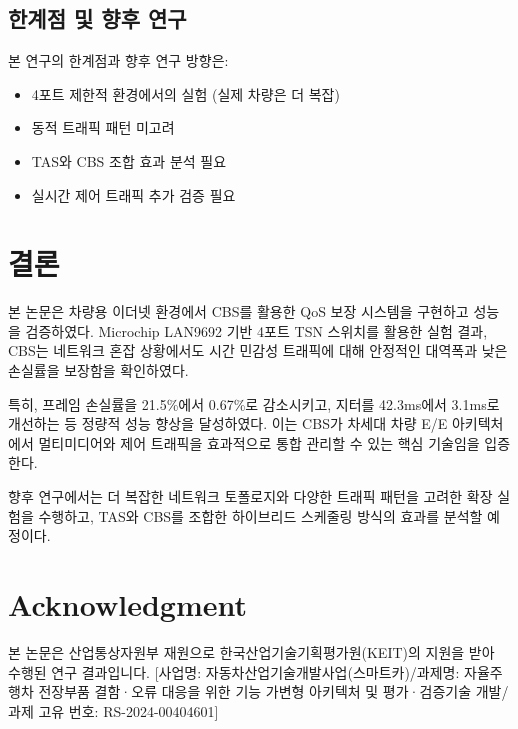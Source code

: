 \documentclass[10pt,twocolumn]{article}
\begin{document}
\subsection{한계점 및 향후 연구}
본 연구의 한계점과 향후 연구 방향은:
\begin{itemize}
\item 4포트 제한적 환경에서의 실험 (실제 차량은 더 복잡)
\item 동적 트래픽 패턴 미고려
\item TAS와 CBS 조합 효과 분석 필요
\item 실시간 제어 트래픽 추가 검증 필요
\end{itemize}

\section{결론}
본 논문은 차량용 이더넷 환경에서 CBS를 활용한 QoS 보장 시스템을 구현하고 성능을 검증하였다. Microchip LAN9692 기반 4포트 TSN 스위치를 활용한 실험 결과, CBS는 네트워크 혼잡 상황에서도 시간 민감성 트래픽에 대해 안정적인 대역폭과 낮은 손실률을 보장함을 확인하였다.

특히, 프레임 손실률을 21.5\%에서 0.67\%로 감소시키고, 지터를 42.3ms에서 3.1ms로 개선하는 등 정량적 성능 향상을 달성하였다. 이는 CBS가 차세대 차량 E/E 아키텍처에서 멀티미디어와 제어 트래픽을 효과적으로 통합 관리할 수 있는 핵심 기술임을 입증한다.

향후 연구에서는 더 복잡한 네트워크 토폴로지와 다양한 트래픽 패턴을 고려한 확장 실험을 수행하고, TAS와 CBS를 조합한 하이브리드 스케줄링 방식의 효과를 분석할 예정이다.

\section*{Acknowledgment}
본 논문은 산업통상자원부 재원으로 한국산업기술기획평가원(KEIT)의 지원을 받아 수행된 연구 결과입니다. [사업명: 자동차산업기술개발사업(스마트카)/과제명: 자율주행차 전장부품 결함·오류 대응을 위한 기능 가변형 아키텍처 및 평가·검증기술 개발/과제 고유 번호: RS-2024-00404601]
\end{document}
